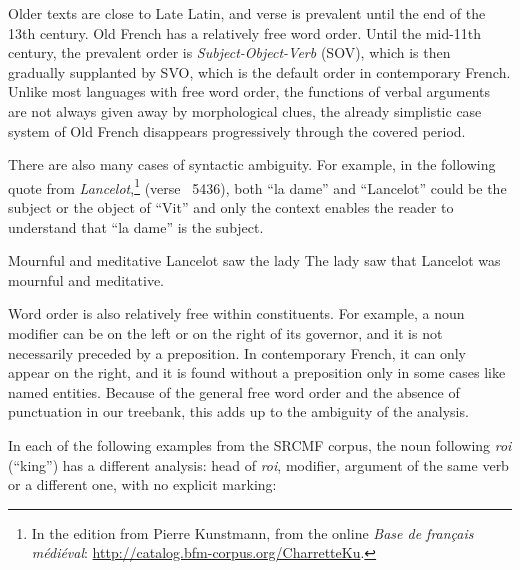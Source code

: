 Older texts are close to Late Latin, and verse is prevalent until the end of the 13th century. Old French has a relatively free word order.
Until the mid-11th century, the prevalent order is \textit{Subject-Object-Verb} (SOV), which is then gradually supplanted by SVO, which is the default order in contemporary French.
Unlike most languages with free word order, the functions of verbal arguments are not always given away by morphological clues, the already simplistic %
case system of Old French disappears progressively through the covered period.

There are also many cases of syntactic ambiguity. For example, in the following quote from \emph{Lancelot},\footnote{In the edition from Pierre Kunstmann, from the online \textit{Base de français médiéval}: \url{http://catalog.bfm-corpus.org/CharretteKu}.} (verse ~5436),
both \enquote{la dame} and \enquote{Lancelot} could be the subject or the object of \enquote{Vit} and only the context enables the reader to understand that \enquote{la dame} is the subject.

{Mournful and meditative Lancelot saw the lady}
{The lady saw that Lancelot was mournful and meditative.}

Word order is also relatively free within constituents. For example, a noun modifier can be on the left or on the right of its governor, and it is not necessarily preceded by a preposition. In contemporary French, it can only appear on the right, and it is found without a preposition only in some cases like named entities. Because of the general free word order and the absence of punctuation in our treebank, this adds up to the ambiguity of the analysis.

In each of the following examples from the SRCMF corpus, the noun following \emph{roi} (\enquote{king}) has a different analysis: head of \emph{roi}, modifier, argument of the same verb or a different one, with no explicit marking:

